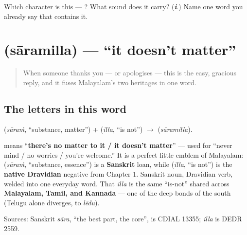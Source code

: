 \begin{tcolorbox}[breakable,colback=teal!4,colframe=teal!35!black,title={Before you move on}]
Which character is this — ? What sound does it carry? (\emph{\textbf{i}}.) Name one word you already say that contains it.
\end{tcolorbox}
\section[\texorpdfstring{\ml{സാരമില്ല} (sāramilla)}{സാരമില്ല (sāramilla)}]{ (sāramilla) — \textquotedblleft{}it doesn't matter\textquotedblright{}}

\label{lesson:ML-C03-saaramilla}



\begin{quote}
When someone thanks you — or apologises — this is the easy, gracious reply, and it fuses Malayalam's two heritages in one word.
\end{quote}

\subsection*{The letters in this word}
\textbf{} (\emph{sāraṁ}, \textquotedblleft{}substance, matter\textquotedblright{}) + \textbf{} (\emph{illa}, \textquotedblleft{}is not\textquotedblright{}) $\to$ \textbf{} (\emph{sāramilla}).

\begin{cousinweb}
\textbf{} means \textquotedblleft{}\textbf{there's no matter to it / it doesn't matter}\textquotedblright{} — used for \textquotedblleft{}never mind / no worries / you're welcome.\textquotedblright{} It is a perfect little emblem of Malayalam: \textbf{} (\emph{sāraṁ}, \textquotedblleft{}substance, essence\textquotedblright{}) is a \textbf{Sanskrit} loan, while \textbf{} (\emph{illa}, \textquotedblleft{}is not\textquotedblright{}) is the \textbf{native Dravidian} negative from Chapter 1. Sanskrit noun, Dravidian verb, welded into one everyday word. That \emph{illa} is the same \textquotedblleft{}is-not\textquotedblright{} shared across \textbf{Malayalam, Tamil, and Kannada} — one of the deep bonds of the south (Telugu alone diverges, to \emph{lēdu}).

Sources: Sanskrit \emph{sāra}, \textquotedblleft{}the best part, the core\textquotedblright{}, is CDIAL 13355; \emph{illa} is DEDR 2559.
\end{cousinweb}

